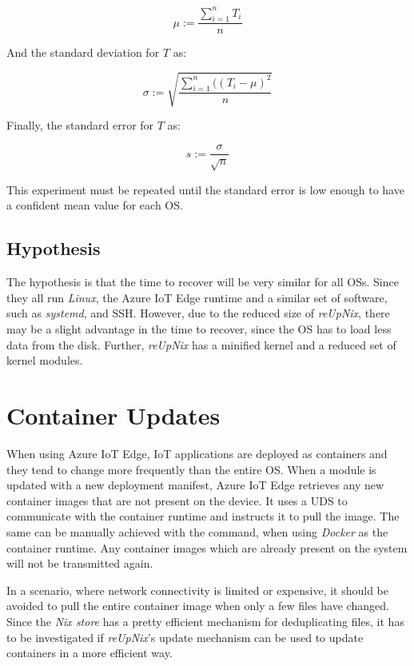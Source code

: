 \begin{equation}
    \mu := \frac{\sum_{i=1}^{n}T_i}{n}
\end{equation}

\noindent
And the standard deviation for $T$ as:

\begin{equation}
   \sigma := \sqrt{\frac{\sum_{i=1}^{n}((T_i - \mu)^2}{n}}
\end{equation}

\noindent
Finally, the standard error for $T$ as:

\begin{equation}
    s := \frac{\sigma}{\sqrt{n}}
\end{equation}

\noindent
This experiment must be repeated until the standard error is low enough
to have a confident mean value for each \ac{OS}.

\subsection{Hypothesis}
The hypothesis is that the time to recover will be very similar for all
\ac{OS}s. Since they all run \textit{Linux}, the Azure IoT Edge runtime and
a similar set of software, such as \textit{systemd}, and \ac{SSH}. However, due
to the reduced size of \textit{reUpNix}, there may be a slight advantage in the
time to recover, since the \ac{OS} has to load less data from the disk. Further,
\textit{reUpNix} has a minified kernel and a reduced set of kernel modules.

\section{Container Updates}
\label{sec:container-updates}
When using Azure IoT Edge, \ac{IoT} applications are deployed as containers and
they tend to change more frequently than the entire \ac{OS}. When a module is updated
with a new deployment manifest, Azure IoT Edge retrieves any new container
images that are not present on the device. It uses a \ac{UDS} to communicate
with the container runtime and instructs it to pull the image. The same can be
manually achieved with the  command, when using \textit{Docker}
as the container runtime. Any container images which are already present on the
system will not be transmitted again.

In a scenario, where network connectivity is limited or expensive,
it should be avoided to pull the entire container image when only a few files have
changed. Since the \textit{Nix store} has a pretty efficient mechanism for
deduplicating files, it has to be investigated if \textit{reUpNix}'s
update mechanism can be used to update containers in a more efficient way.

